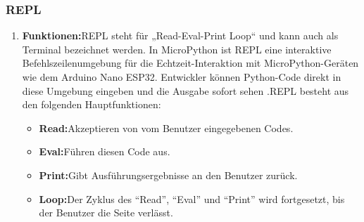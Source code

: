 \subsubsection{REPL}
\begin{enumerate}
	
	\item \textbf{Funktionen:}REPL steht für „Read-Eval-Print Loop“ und kann auch als Terminal bezeichnet werden. In MicroPython ist REPL eine interaktive Befehlszeilenumgebung für die Echtzeit-Interaktion mit MicroPython-Geräten wie dem Arduino Nano ESP32. Entwickler können Python-Code direkt in diese Umgebung eingeben und die Ausgabe sofort sehen \cite{VanBinsbergen:2020}.REPL besteht aus den folgenden Hauptfunktionen:
	\begin{itemize}
		\item \textbf{Read:}Akzeptieren von vom Benutzer eingegebenen Codes.
		\item \textbf{Eval:}Führen diesen Code aus.
		\item \textbf{Print:}Gibt Ausführungsergebnisse an den Benutzer zurück.
		\item \textbf{Loop:}Der Zyklus des ``Read'', ``Eval'' und ``Print'' wird fortgesetzt, bis der Benutzer die Seite verlässt.
	\end{itemize}
	

\end{enumerate}
